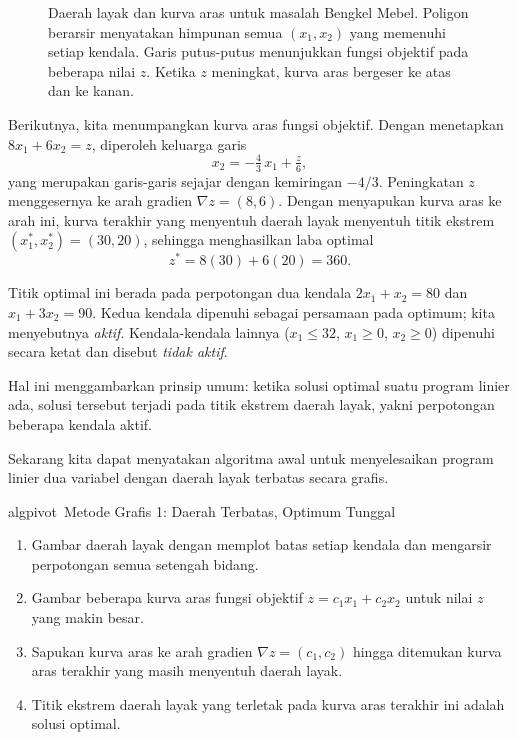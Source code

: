 \begin{solution}
\begin{figure}[H]
\caption{Daerah layak dan kurva aras untuk masalah Bengkel Mebel. Poligon berarsir menyatakan himpunan semua $(x_1,x_2)$ yang memenuhi setiap kendala. Garis putus-putus menunjukkan fungsi objektif pada beberapa nilai $z$. Ketika $z$ meningkat, kurva aras bergeser ke atas dan ke kanan.}
\label{fig:FurnitureWorkshopFeasibleRegion}
\end{figure}

Berikutnya, kita menumpangkan kurva aras fungsi objektif. Dengan menetapkan $8x_1 + 6x_2 = z$, diperoleh keluarga garis
\[
x_2 = -\tfrac{4}{3}\,x_1 + \tfrac{z}{6},
\]
yang merupakan garis-garis sejajar dengan kemiringan $-4/3$. Peningkatan $z$ menggesernya ke arah gradien $\nabla z = (8,6)$. Dengan menyapukan kurva aras ke arah ini, kurva terakhir yang menyentuh daerah layak menyentuh titik ekstrem $(x_1^*,x_2^*) = (30,20)$, sehingga menghasilkan laba optimal
\[
z^* = 8(30) + 6(20) = 360.
\]

Titik optimal ini berada pada perpotongan dua kendala $2x_1+x_2=80$ dan $x_1+3x_2=90$. Kedua kendala dipenuhi sebagai persamaan pada optimum; kita menyebutnya \textit{aktif}. Kendala-kendala lainnya ($x_1\leq 32$, $x_1\geq 0$, $x_2\geq 0$) dipenuhi secara ketat dan disebut \textit{tidak aktif}.

Hal ini menggambarkan prinsip umum: ketika solusi optimal suatu program linier ada, solusi tersebut terjadi pada titik ekstrem daerah layak, yakni perpotongan beberapa kendala aktif.
\end{solution}

Sekarang kita dapat menyatakan algoritma awal untuk menyelesaikan program linier dua variabel dengan daerah layak terbatas secara grafis.
\begin{stepbox}{algpivot}{\ Metode Grafis 1: Daerah Terbatas, Optimum Tunggal}
\begin{enumerate}[nosep]
\item Gambar daerah layak dengan memplot batas setiap kendala dan mengarsir perpotongan semua setengah bidang.
\item Gambar beberapa kurva aras fungsi objektif $z = c_1 x_1 + c_2 x_2$ untuk nilai $z$ yang makin besar.
\item Sapukan kurva aras ke arah gradien $\nabla z = (c_1, c_2)$ hingga ditemukan kurva aras terakhir yang masih menyentuh daerah layak.
\item Titik ekstrem daerah layak yang terletak pada kurva aras terakhir ini adalah solusi optimal.
\end{enumerate}
\end{stepbox}

